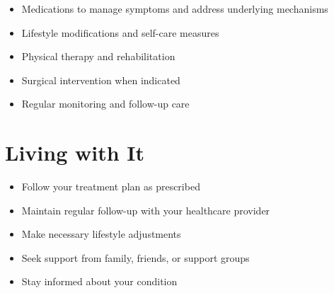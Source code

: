 \begin{itemize}[noitemsep]
  \item Medications to manage symptoms and address underlying mechanisms
  \item Lifestyle modifications and self-care measures
  \item Physical therapy and rehabilitation
  \item Surgical intervention when indicated
  \item Regular monitoring and follow-up care
\end{itemize}
\section{Living with It}
\begin{itemize}[noitemsep]
  \item Follow your treatment plan as prescribed
  \item Maintain regular follow-up with your healthcare provider
  \item Make necessary lifestyle adjustments
  \item Seek support from family, friends, or support groups
  \item Stay informed about your condition
\end{itemize}
